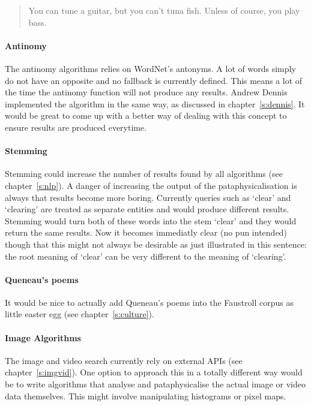 \begin{quotation}
   You can tune a guitar, but you can't tuna fish. Unless of course, you play bass. 
\end{quotation}

\paragraph{Antinomy}
The antinomy algorithms relies on WordNet's antonyms. A lot of words simply do not have an opposite and no fallback is currently defined. This means a lot of the time the antinomy function will not produce any results. Andrew Dennis implemented the algorithm in the same way, as discussed in chapter~\ref{s:dennis}. It would be great to come up with a better way of dealing with this concept to ensure results are produced everytime.

\paragraph{Stemming}
Stemming could increase the number of results found by all algorithms (see chapter~\ref{s:nlp}). A danger of increasing the output of the pataphysicalisation is always that results become more boring. Currently queries such as `clear' and `clearing' are treated as separate entities and would produce different results. Stemming would turn both of these words into the stem `clear' and they would return the same results. Now it becomes immediatly clear (no pun intended) though that this might not always be desirable as just illustrated in this sentence: the root meaning of `clear' can be very different to the meaning of `clearing'.

\paragraph{Queneau's poems}
It would be nice to actually add Queneau's poems \autocite{Queneau1961} into the Faustroll corpus as little easter egg (see chapter~\ref{s:culture}).

\paragraph{Image Algorithms}
The image and video search currently rely on external \ac{API}s (see chapter~\ref{s:imgvid}). One option to approach this in a totally different way would be to write algorithms that analyse and pataphysicalise the actual image or video data themselves. This might involve manipulating histograms or pixel maps.

